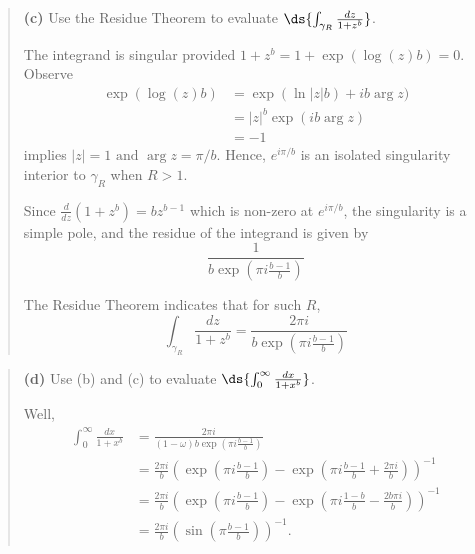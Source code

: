 \documentclass{homework}
\begin{document}
\begin{quote}
  {\bf (c)} Use the Residue Theorem to evaluate $\ds{\int_{\gamma_R} \frac{dz}{1+z^b}}$.
  \begin{solution}
    The integrand is singular provided $1 + z^b = 1 + \exp(\log(z)b) = 0$. Observe
    \begin{align*}
      \exp(\log(z)b) &= \exp(\ln|z|b) + ib\arg z) \\
      &= |z|^b \exp(ib\arg z) \\
      &= -1 
    \end{align*}
    implies $|z| = 1\text{ and }\arg z = \pi/b$.
    Hence, $e^{i\pi/b}$ is an isolated singularity interior to $\gamma_R$ when $R>1$.  

    Since $\frac d{dz} (1 + z^b) = bz^{b-1}$ which is non-zero at $e^{i\pi/b}$, the singularity
    is a simple pole, and the residue of the integrand is given by
    $$
      \frac{1}{b\exp\left(\pi i \frac{b-1}{b}\right)}
    $$
    
    The Residue Theorem indicates that for such $R$,
    $$
      \int_{\gamma_R} \frac{dz}{1+z^b} = \frac{2\pi i}{b\exp\left(\pi i \frac{b-1}{b}\right)}
    $$
  \end{solution}
\end{quote}
\begin{quote}
  {\bf (d)} Use (b) and (c) to evaluate $\ds{\int_0^\infty \frac{dx}{1+x^b}}$.
  \begin{solution}
    Well,
    \begin{align*}
      \int_0^\infty \frac{dx}{1+x^b} 
      &=  \frac{2\pi i}{(1-\omega)b\exp\left(\pi i \frac{b-1}{b}\right)}\\
      &= \frac{2\pi i}{b}\left(\exp\left(\pi i \frac{b-1}{b}\right) - \exp\left(\pi i \frac{b-1}{b} + \frac{2\pi i}{b} \right)\right)^{-1}\\
      &= \frac{2\pi i}{b}\left(\exp\left(\pi i \frac{b-1}{b}\right) - \exp\left(\pi i \frac{1-b}{b} - \frac{2b\pi i}{b} \right)\right)^{-1}\\
      &= \frac{2\pi i}{b}\left(\sin\left(\pi\frac{b-1}{b}\right)\right)^{-1}.
    \end{align*}
  \end{solution}
\end{quote}




\end{document}
